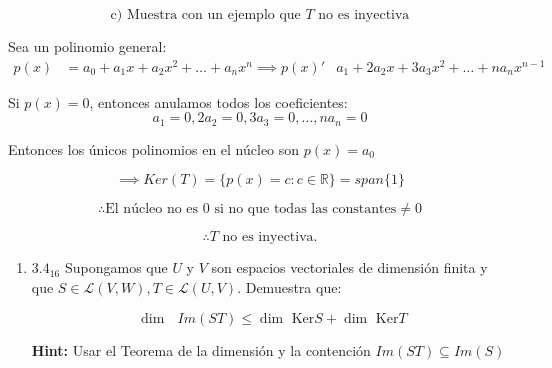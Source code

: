 \documentclass{article}
\begin{document}
\begin{enumerate}
			\begin{equation*}
				\text{c) Muestra con un ejemplo que } T \text{ no es inyectiva}
			\end{equation*}
			
			Sea un polinomio general:
			\begin{equation*}
				\begin{aligned}
					p(x)&=a_0+a_1x+a_2x^2+\dots+a_{n}x^n
					\implies p(x)' &a_1+2a_2x+3a_3x^2+\dots+na_nx^{n-1}
				\end{aligned}
			\end{equation*}
			
			Si \(p(x)=0\), entonces anulamos todos los coeficientes:
			\begin{equation*}
				a_1=0, 2a_2=0, 3a_3=0,\dots,na_{n}=0
			\end{equation*}
			
			Entonces los únicos polinomios en el núcleo son \(p(x)=a_0\)
			
			\[
			\implies Ker(T)=\{p(x)=c : c\in \mathbb{R} \}=span\{1\}
			\]
			
			\[
			\therefore \text{El núcleo no es }0\text{ si no que todas las constantes}\neq 0 
			\]
			
			\[
			\boxed{\therefore T \text{ no es inyectiva.} }
			\]
			
		\end{enumerate}
		
		\begin{enumerate}
			
			
			\item[] \(3.4_{16}\) Supongamos que \(U\) y \(V\) son espacios vectoriales de dimensión finita y que \(S\in\mathscr{L}(V,W), T\in\mathscr{L}(U,V)\). Demuestra que:
			
			\begin{equation*}
				\dim\text{ }Im(ST) \leq \dim\text{ Ker}S + \dim\text{ Ker}T
			\end{equation*}
			
			\textbf{Hint:} Usar el Teorema de la dimensión y la contención \(Im(ST) \subseteq Im(S)\)
			
		\end{enumerate}
		
\end{document}
